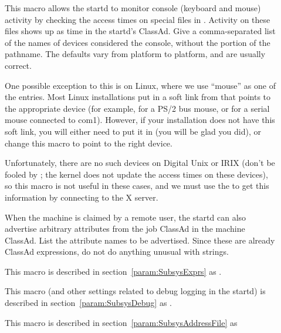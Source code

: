 \begin{description}
\item[] \label{param:ConsoleDevices} This
  macro allows the startd to monitor console (keyboard and mouse)
  activity by checking the access times on special files in
  .  Activity on these files shows up as 
  time in the startd's ClassAd.  Give a comma-separated list of
  the names of devices considered the console, without the
   portion of the pathname.  The defaults vary from
  platform to platform, and are usually correct.  

  One possible exception to this is on Linux, where
  we use ``mouse'' as
  one of the entries.  Most Linux installations put in a
  soft link from  that points to the appropriate
  device (for example,  for a PS/2 bus mouse, or
   for a serial mouse connected to com1).  However,
  if your installation does not have this soft link, you will either
  need to put it in (you will be glad you did), or change this
  macro to point to the right device. 
  
  Unfortunately, there are no such devices on Digital Unix or IRIX
  (don't be fooled by ; the kernel does not
  update the access times on these devices), so this macro is not
  useful in these cases, and we must use the  to get this
  information by connecting to the X server.
  
\item[] \label{param:StartdJobExprs} When
  the machine is claimed by a remote user, the startd can also advertise
  arbitrary attributes from the job ClassAd in the machine
  ClassAd.
  List the attribute names to be advertised.  \Note Since
  these are already ClassAd expressions, do not do anything
  unusual with strings.

\item[] \label{param:StartdExprs} This macro is
  described in section~\ref{param:SubsysExprs} as
  .

\item[] \label{param:StartdDebug} This macro
  (and other settings related to debug logging in the startd) is
  described in section~\ref{param:SubsysDebug} as
  .

\item[] \label{param:StartdAddressFile}
  This macro is described in
  section~\ref{param:SubsysAddressFile} as


\end{description}
